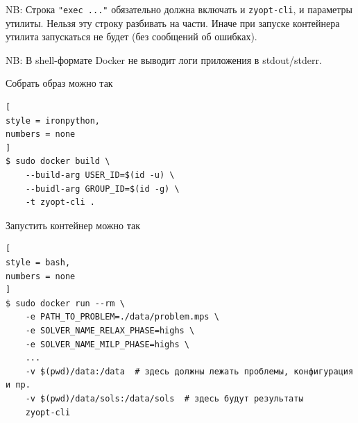 \documentclass[%
	11pt,
	a4paper,
	utf8,
		]{article}
\begin{document}
NB: Строка \verb|"exec ..."| обязательно должна включать и \verb*|zyopt-cli|, и параметры утилиты. Нельзя эту строку разбивать на части. Иначе при запуске контейнера утилита запускаться не будет (без сообщений об ошибках).

NB: В shell-формате Docker не выводит логи приложения в stdout/stderr.

Собрать образ можно так
\begin{lstlisting}[
style = ironpython,
numbers = none
]
$ sudo docker build \
    --build-arg USER_ID=$(id -u) \
    --buidl-arg GROUP_ID=$(id -g) \
    -t zyopt-cli .
\end{lstlisting}

Запустить контейнер можно так
\begin{lstlisting}[
style = bash,
numbers = none
]
$ sudo docker run --rm \
	-e PATH_TO_PROBLEM=./data/problem.mps \
	-e SOLVER_NAME_RELAX_PHASE=highs \
	-e SOLVER_NAME_MILP_PHASE=highs \
	...
	-v $(pwd)/data:/data  # здесь должны лежать проблемы, конфигурация и пр.
	-v $(pwd)/data/sols:/data/sols  # здесь будут результаты
	zyopt-cli
\end{lstlisting}



\begin{thebibliography}{99}
	
	
\end{thebibliography}

\end{document}
